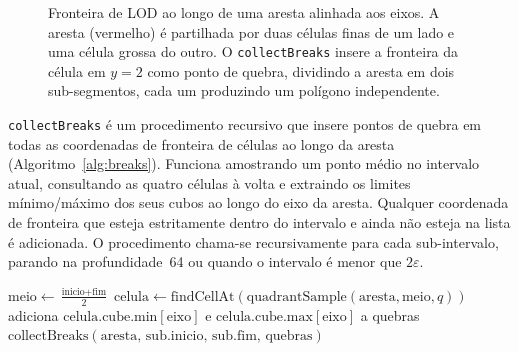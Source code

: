 \documentclass[10pt,a4paper]{article}
\begin{document}
\begin{figure}[htb]
\centering
{}
\caption{Fronteira de LOD ao longo de uma aresta alinhada aos eixos.
A aresta (vermelho) é partilhada por duas células finas de um lado
e uma célula grossa do outro. O \texttt{collectBreaks} insere a
fronteira da célula em $y=2$ como ponto de quebra, dividindo a aresta
em dois sub-segmentos, cada um produzindo um polígono independente.}
\label{fig:lod_boundary}
\end{figure}

\lstinline{collectBreaks} é um procedimento recursivo que insere
pontos de quebra em todas as coordenadas de fronteira de células ao
longo da aresta (Algoritmo~\ref{alg:breaks}). Funciona amostrando
um ponto médio no intervalo atual, consultando as quatro células
à volta e extraindo os limites mínimo/máximo dos seus cubos ao longo
do eixo da aresta. Qualquer coordenada de fronteira que esteja
estritamente dentro do intervalo e ainda não esteja na lista é
adicionada. O procedimento chama-se recursivamente para cada
sub-intervalo, parando na profundidade~64 ou quando o intervalo é
menor que $2\varepsilon$.

\begin{algorithm}[H]
\caption{\lstinline{collectBreaks}(aresta, inicio, fim, quebras)}
\label{alg:breaks}
\begin{algorithmic}[1]
  \Return
\EndIf
\State $\text{meio} \leftarrow \tfrac{\text{inicio}+\text{fim}}{2}$
  \State $\text{celula} \leftarrow \text{findCellAt}(\text{quadrantSample}(\text{aresta}, \text{meio}, q))$
  \State adiciona $\text{celula.cube.min}[\text{eixo}]$ e $\text{celula.cube.max}[\text{eixo}]$ a quebras
\EndFor
{}
  \State $\text{collectBreaks}(\text{aresta, sub.inicio, sub.fim, quebras})$
\EndFor
\end{algorithmic}
\end{algorithm}
\end{document}
